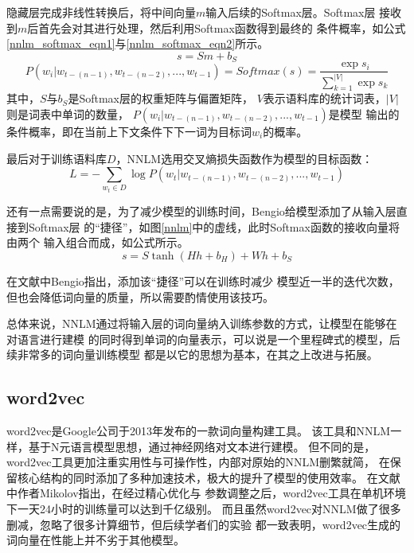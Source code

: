 \documentclass{standalone}
\begin{document}
隐藏层完成非线性转换后，将中间向量$m$输入后续的Softmax层。Softmax层
接收到$m$后首先会对其进行处理，然后利用Softmax函数得到最终的
条件概率，如公式\ref{nnlm_softmax_eqn1}与\ref{nnlm_softmax_eqn2}所示。
\begin{equation}
    s = Sm+b_S
    \label{nnlm_softmax_eqn1}
\end{equation}
\begin{equation}
    P\left ( w_i|w_{t-(n-1)},w_{t-(n-2)},...,w_{t-1} \right ) = 
    Softmax\left(s\right)=
    \frac{\exp s_i}{\sum_{k=1}^{|V|}\exp s_k}
    \label{nnlm_softmax_eqn2}
\end{equation}
其中，$S$与$b_S$是Softmax层的权重矩阵与偏置矩阵，
$V$表示语料库的统计词表，$|V|$则是词表中单词的数量，
$P\left ( w_i|w_{t-(n-1)},w_{t-(n-2)},...,w_{t-1} \right )$是模型
输出的条件概率，即在当前上下文条件下下一词为目标词$w_i$的概率。

最后对于训练语料库$D$，NNLM选用交叉熵损失函数作为模型的目标函数：
\begin{equation}
    L = -\sum_{w_t \in D}\log P\left ( w_t | w_{t-(n-1)},w_{t-(n-2)},...,w_{t-1} \right )
    \label{nnlm_loss_eqn}
\end{equation}


还有一点需要说的是，为了减少模型的训练时间，Bengio给模型添加了从输入层直接到Softmax层
的“捷径”，如图\ref{nnlm}中的虚线，此时Softmax函数的接收向量将由两个
输入组合而成，如公式所示。
\begin{equation}
    s = S\tanh \left ( Hh+b_H \right ) + Wh + b_S
\end{equation}

在文献\cite{bengio2003neural}中Bengio指出，添加该“捷径”可以在训练时减少
模型近一半的迭代次数，但也会降低词向量的质量，所以需要酌情使用该技巧。

总体来说，NNLM通过将输入层的词向量纳入训练参数的方式，让模型在能够在对语言进行建模
的同时得到单词的向量表示，可以说是一个里程碑式的模型，后续非常多的词向量训练模型
都是以它的思想为基本，在其之上改进与拓展。


\subsection{word2vec}
\label{sect_word2vec}
word2vec是Google公司于2013年发布的一款词向量构建工具。
该工具和NNLM一样，基于N元语言模型思想，通过神经网络对文本进行建模。
但不同的是，word2vec工具更加注重实用性与可操作性，内部对原始的NNLM删繁就简，
在保留核心结构的同时添加了多种加速技术，极大的提升了模型的使用效率。
在文献\cite{mikolov2013distributed}中作者Mikolov指出，在经过精心优化与
参数调整之后，word2vec工具在单机环境下一天24小时的训练量可以达到千亿级别。
而且虽然word2vec对NNLM做了很多删减，忽略了很多计算细节，但后续学者们的实验
都一致表明，word2vec生成的词向量在性能上并不劣于其他模型。
\end{document}
